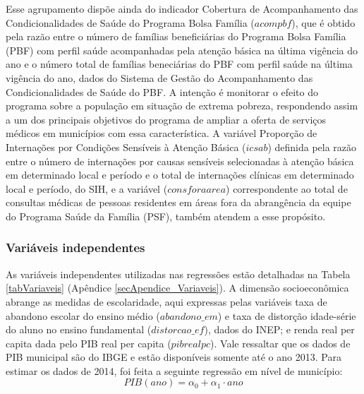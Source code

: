 \documentclass[twoside,onecolumn,12pt]{article}
\numberwithin{outputctr}{section}
\begin{document}
Esse agrupamento disp\~{o}e ainda do indicador Cobertura de Acompanhamento das Condicionalidades de Sa\'{u}de do Programa Bolsa Fam\'{i}lia ($acompbf$), que \'{e} obtido pela raz\~{a}o entre o n\'{u}mero de fam\'{i}lias benefici\'{a}rias do Programa Bolsa Fam\'{i}lia (PBF) com perfil sa\'{u}de acompanhadas pela aten\c{c}\~{a}o b\'{a}sica na \'{u}ltima vig\^{e}ncia do ano e o  n\'{u}mero total de fam\'{i}lias beneci\'{a}rias do PBF com perfil sa\'{u}de na \'{u}ltima vig\^{e}ncia do ano, dados do Sistema de Gest\~{a}o do Acompanhamento das Condicionalidades de Sa\'{u}de do PBF. A inten\c{c}\~{a}o \'{e} monitorar o efeito do programa sobre a popula\c{c}\~{a}o em situa\c{c}\~{a}o de extrema pobreza, respondendo assim a um dos principais objetivos do programa de ampliar a oferta de servi\c{c}os m\'{e}dicos em munic\'{i}pios com essa caracter\'{i}stica. A vari\'{a}vel Propor\c{c}\~{a}o de Interna\c{c}\~{o}es por Condi\c{c}\~{o}es Sens\'{i}veis \`{a} Aten\c{c}\~{a}o B\'{a}sica ($icsab$) definida pela raz\~{a}o entre o n\'{u}mero de interna\c{c}\~{o}es por causas sens\'{i}veis selecionadas \`{a} aten\c{c}\~{a}o b\'{a}sica em determinado local e per\'{i}odo e o total de interna\c{c}\~{o}es cl\'{i}nicas em determinado local e per\'{i}odo, do SIH, e a vari\'{a}vel ($consforaarea$) correspondente ao total de consultas m\'{e}dicas de pessoas residentes em \'{a}reas fora da abrang\^{e}ncia da equipe do Programa Sa\'{u}de da Fam\'{i}lia (PSF), tamb\'{e}m atendem a esse prop\'{o}sito.

\subsubsection{Vari\'{a}veis independentes}


As vari\'{a}veis independentes utilizadas nas regress\~{o}es est\~{a}o detalhadas
na Tabela \ref{tabVariaveis} (Ap\^{e}ndice \ref{secApendice_Variaveis}). A dimensão socioeconômica abrange as medidas de escolaridade, aqui expressas pelas vari\'{a}veis taxa de abandono escolar do ensino médio ($abandono\_em$) e taxa de distor\c{c}\~{a}o idade-s\'{e}rie do aluno no ensino fundamental ($distorcao\_ef$), dados do INEP; e renda real per capita dada pelo PIB real per capita ($pibrealpc$). Vale ressaltar que os dados de PIB municipal são do IBGE e est\~{a}o dispon\'{i}veis somente at\'{e} o ano 2013. Para estimar os dados de 2014, foi feita a seguinte regress\~{a}o em nível de munic\'{i}pio:
\begin{equation}
 PIB(ano) = \alpha_0 + \alpha_1 \cdot ano
 \label{eq_estimativa_pib_municipal_1}
\end{equation}
\end{document}
